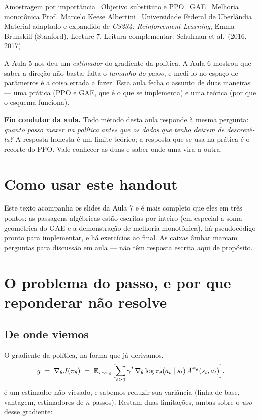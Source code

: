 \documentclass[11pt]{article}
\newcommand{\thv}{\theta}
\newcommand{\polth}{\pol_{\thv}}
\newcommand{\gth}{\nabla_{\thv}}
\newcommand{\traj}{\tau}
\newcommand{\Adv}{A}
\begin{document}
     {Amostragem por importância \textbullet\ Objetivo substituto e PPO \textbullet\ GAE \textbullet\
      Melhoria monotônica}
     {Prof.\ Marcelo Keese Albertini \textbullet\ Universidade Federal de Uberlândia}
     {Material adaptado e expandido de \textit{CS234: Reinforcement Learning}, Emma Brunskill
      (Stanford), Lecture 7. Leitura complementar: Schulman et al.\ (2016, 2017).}

\noindent
A Aula 5 nos deu um \emph{estimador} do gradiente da política. A Aula 6 mostrou que
saber a direção não basta: falta o \emph{tamanho do passo}, e medi-lo no espaço de
parâmetros é a coisa errada a fazer. Esta aula fecha o assunto de duas maneiras --- uma
prática (PPO e GAE, que é o que se implementa) e uma teórica (por que o esquema funciona).

\begin{ideiabox}
  \textbf{Fio condutor da aula.} Todo método desta aula responde à mesma pergunta:
  \emph{quanto posso mexer na política antes que os dados que tenho deixem de
  descrevê-la?} A resposta honesta é um limite teórico; a resposta que se usa na prática
  é o recorte do PPO. Vale conhecer as duas e saber onde uma vira a outra.
\end{ideiabox}

\section*{Como usar este handout}

Este texto acompanha os slides da Aula 7 e é mais completo que eles em três pontos: as
passagens algébricas estão escritas por inteiro (em especial a soma geométrica do GAE e
a demonstração de melhoria monotônica), há pseudocódigo pronto para implementar, e há
exercícios ao final. As caixas \textcolor{rlAmbar}{âmbar} marcam perguntas para discussão
em aula --- não têm resposta escrita aqui de propósito.

\section{O problema do passo, e por que reponderar não resolve}

\subsection{De onde viemos}

O gradiente da política, na forma que já derivamos,
\[
  g \;=\; \gth J(\polth) \;=\;
  \E_{\traj\sim\polth}\Bigl[\sum_{t\ge0}\gamma^t\,\gth\log\polth(a_t\mid s_t)\,
  \Adv^{\polth}(s_t,a_t)\Bigr],
\]
é um estimador não-viesado, e sabemos reduzir sua variância (linha de base, vantagem,
estimadores de $n$ passos). Restam duas limitações, ambas sobre o \emph{uso} desse
gradiente:
\end{document}
